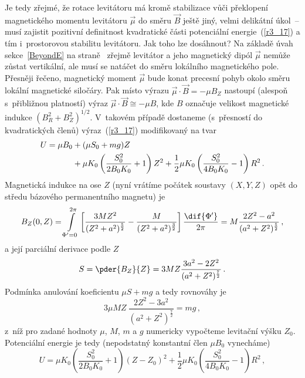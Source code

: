 Je tedy zřejmé, že rotace levitátoru má kromě stabilizace vůči překlopení
magnetického momentu levitátoru $\vec{\mu}$ do směru $\vec{B}$ ještě jiný,
velmi delikátní úkol~-- musí zajistit pozitivní definitnost kvadratické části
potenciální energie~(\ref{r3_17}) a tím i~prostorovou stabilitu
levitátoru. Jak toho lze dosáhnout? Na základě úvah sekce~\ref{BeyondE} na
straně~\pageref{BeyondE} zřejmě levitátor a jeho magnetický dipól $\vec{\mu}$
nemůže zůstat vertikální, ale musí se natáčet do směru lokálního magnetického
pole. Přesněji řečeno, magnetický moment $\vec{\mu}$ bude konat precesní pohyb
okolo směru lokální magnetické siločáry.  Pak místo výrazu
$\vec{\mu}\cdot\vec{B}=-\mu B_{Z}$ nastoupí (alespoň s~přibližnou platností)
výraz $\vec{\mu}\cdot\vec{B}\cong -\mu B$, kde $B$ označuje velikost
magnetické indukce $\left(B_{R}^{2}+B_{Z}^{2}\right)^{1/2}$. V~takovém případě
dostaneme (s~přesností do kvadratických členů) výraz~(\ref{r3_17})
modifikovaný na tvar~\cite{Hab:1999:MgrDP:ProbUlFyzPrakt}
\begin{align}
  U = \mu B_{0}&+(\mu S_{0} +mg)Z\notag\\
    &+\mu K_{0} \left(\frac{S^{2}_{0}}{2B_{0}K_{0}}+1\right)Z^{2}
    +\frac{1}{2}\mu K_{0}\left(\frac{S^{2}_{0}}{4B_{0}K_{0}}
      -1\right)R^{2}\,.                                            \label{r3_18}
\end{align}
Magnetická indukce na ose $Z$ (nyní vrátíme počátek soustavy $(X,Y,Z)$ opět do
středu bázového permanentního magnetu) je
\begin{equation}
  B_{Z}(0,Z)=\int
  \limits_{\Phi'=0}^{2\pi}\left[\frac{3MZ^{2}}{(Z^{2}+a^{2})^{\frac{5}{2}}}-
  \frac{M}{(Z^{2}+a^{2})^{\frac{3}{2}}}\right]\frac{\dif{\Phi'}}{2\pi}=
  M\frac{2Z^{2}-a^{2}}{(a^{2}+Z^{2})^{\frac{5}{2}}}\,,                  \label{r3_19}
\end{equation}
a její parciální derivace podle $Z$
\begin{equation}
  S = \pder{B_{Z}}{Z}
    = 3MZ\frac{3a^{2}-2Z^{2}}{(a^{2}+Z^{2})^{\frac{7}{2}}}\,.           \label{r3_20}
\end{equation}
Podmínka anulování koeficientu $\mu S+mg$ a tedy rovnováhy je
\begin{equation}
  3\mu M Z~\frac{2Z^{2}-3a^{2}}{(a^{2}+Z^{2})^{\frac{7}{2}}}=mg\,,      \label{r3_21}
\end{equation}
z~níž pro zadané hodnoty $\mu$, $M$, $m$ a $g$ numericky vypočteme levitační
výšku $Z_{0}$.  Potenciální energie je tedy (nepodstatný konstantní člen
$\mu B_{0}$ vynecháme)
\begin{equation}
  U = \mu K_{0} \left(\frac{S^{2}_{0}}{2B_{0}K_{0}}+1\right)(Z-Z_{0})^{2}
  +\frac{1}{2}\mu K_{0}
  \left( \frac{S^{2}_{0}}{4B_{0}K_{0}}-1\right)R^{2}\,,               \label{r3_22}
\end{equation}
